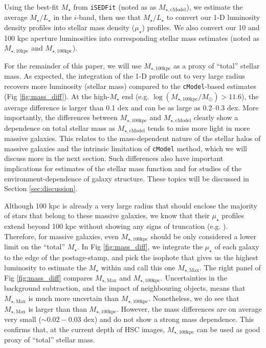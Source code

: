 \documentclass[a4paper,fleqn,usenatbib]{mnras}
\def\cmodel{\texttt{cModel}}
\def\mstar{{$M_{\star}$}}
\def\minn{{$M_{\star,10\mathrm{kpc}}$}}
\def\mtot{{$M_{\star,100\mathrm{kpc}}$}}
\def\mmax{{$M_{\star,\mathrm{Max}}$}}
\def\mcmodel{{$M_{\star,\mathrm{cModel}}$}}
\def\logmtot{{$\log (M_{\star,100\mathrm{kpc}}/M_{\odot})$}}
\def\m2l{{$M_{\star}/L_{\star}$}}
\def\mden{{$\mu_{\star}$}}
\begin{document}
    Using the best-fit \mstar{} from \texttt{iSEDFit} (noted as as \mcmodel{}), 
    we estimate the average \m2l{} in the $i$-band, then use that \m2l{} to convert 
    our 1-D luminosity density profiles into stellar mass density (\mden{}) profiles. 
    We also convert our 10 and 100 kpc aperture luminosities into corresponding stellar 
    mass estimates (noted as \minn{} and \mtot{}).

    For the remainder of this paper, we will use \mtot{} as a proxy of ``total'' 
    stellar mass. 
    As expected, the integration of the 1-D profile out to very large radius recovers 
    more luminosity (stellar mass) compared to the \cmodel{}-based estimates 
    (Fig \ref{fig:mass_diff}).
    At the high-\mstar{} end (e.g. \logmtot{}$>11.6$), the average difference is larger 
    than 0.1 dex and can be as large as 0.2--0.3 dex.  
    More importantly, the differences between \mtot{} and \mcmodel{} clearly show a 
    dependence on total stellar mass as \mcmodel{} tends to miss more light in 
    more massive galaxies.  
    This relates to the mass-dependent nature of the stellar halos of massive 
    galaxies and the intrinsic limitation of \cmodel{} method, which we will discuss
    more in the next section.
    Such differences also have important implications for estimates of the stellar 
    mass function and for studies of the environment-dependence of galaxy structure. 
    These topics will be discussed in Section \ref{sec:discussion}.
    
    Although 100 kpc is already a very large radius that should enclose the majority 
    of stars that belong to these massive galaxies, we know that their \mden{} 
    profiles extend beyond 100 kpc without showing any signs of truncation
    (e.g. \citealt{Gonzalez2005, Tal2011, DSouza2014}).
    Therefore, for massive galaxies, even \mtot{} should be only considered a lower
    limit on the ``total'' \mstar{}. 
    In Fig \ref{fig:mass_diff}, we integrate the \mden{} of each galaxy to the 
    edge of the postage-stamp, and pick the isophote that gives us the highest  
    luminosity to estimate the \mstar{} within and call this one \mmax{}. 
    The right panel of Fig \ref{fig:mass_diff} compares \mmax{} and \mtot{}.  
    Uncertainties in the background subtraction, and the impact of neighbouring objects,
    means that \mmax{} is much more uncertain than \mtot{}. 
    Nonetheless, we do see that \mmax{} is larger than than \mtot{}. 
    However, the mass differences are on average very small ($\sim0.02-0.03$ dex) and 
    do not show a strong mass dependence.  
    This confirms that, at the current depth of HSC images, \mtot{} can be used as 
    good proxy of ``total'' stellar mass.   
    
\end{document}
